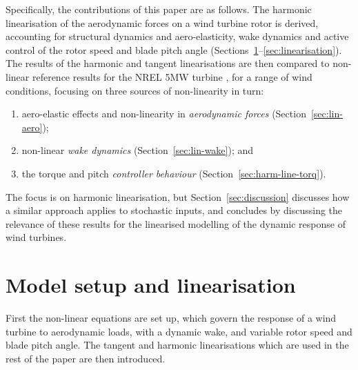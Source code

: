 \documentclass[preprint]{elsarticle}
\begin{document}
Specifically, the contributions of this paper are as follows. The harmonic
linearisation of the aerodynamic forces on a wind turbine rotor is derived,
accounting for structural dynamics and aero-elasticity, wake dynamics and active
control of the rotor speed and blade pitch angle
(Sections~\ref{sec:lin-general}--\ref{sec:linearisation}). The results of the
harmonic and tangent linearisations are then compared to non-linear reference
results for the NREL 5MW turbine \citep{Jonkman2009b}, for a range of wind
conditions, focusing on three sources of non-linearity in turn:
\begin{enumerate}
\item aero-elastic effects and non-linearity in \textit{aerodynamic forces}
  (Section~\ref{sec:lin-aero});
\item non-linear \textit{wake dynamics} (Section~\ref{sec:lin-wake}); and
\item the torque and pitch \textit{controller behaviour}
  (Section~\ref{sec:harm-line-torq}).
\end{enumerate}
The focus is on harmonic linearisation, but Section~\ref{sec:discussion}
discusses how a similar approach applies to stochastic inputs, and concludes by
discussing the relevance of these results for the linearised modelling of the
dynamic response of wind turbines.

\section{Model setup and linearisation}
\label{sec:lin-general}

First the non-linear equations are set up, which govern the response of a wind
turbine to aerodynamic loads, with a dynamic wake, and variable rotor speed and
blade pitch angle. The tangent and harmonic linearisations which are used in the
rest of the paper are then introduced.
\end{document}
